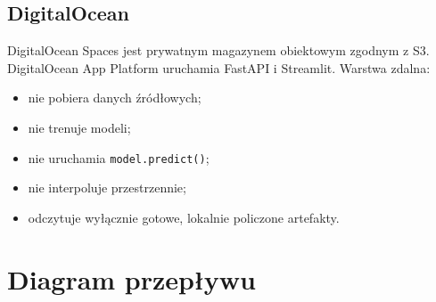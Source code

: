 \documentclass[11pt,a4paper,oneside]{article}
\begin{document}
\subsection{DigitalOcean}

DigitalOcean Spaces jest prywatnym magazynem obiektowym zgodnym z S3.
DigitalOcean App Platform uruchamia FastAPI i Streamlit. Warstwa zdalna:
\begin{itemize}[nosep]
  \item nie pobiera danych źródłowych;
  \item nie trenuje modeli;
  \item nie uruchamia \texttt{model.predict()};
  \item nie interpoluje przestrzennie;
  \item odczytuje wyłącznie gotowe, lokalnie policzone artefakty.
\end{itemize}

\section{Diagram przepływu}
\end{document}
